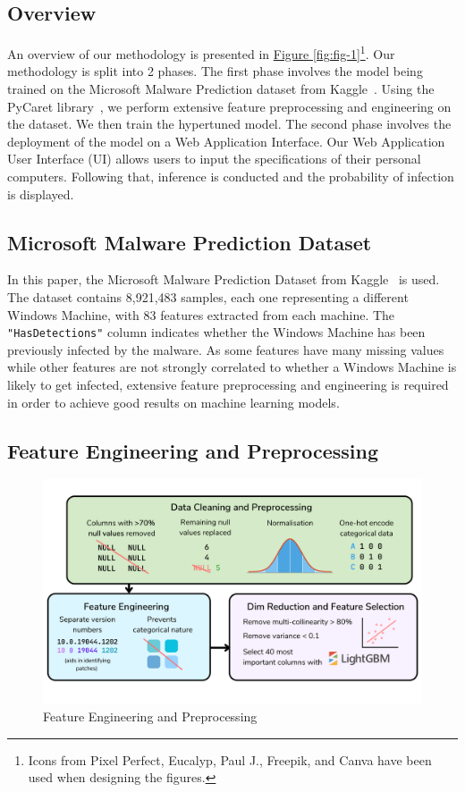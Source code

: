 \documentclass[pdflatex,sn-basic,Numbered]{sn-jnl}%
\theoremstyle{thmstyleone}%
\theoremstyle{thmstyletwo}%
\theoremstyle{thmstylethree}%
\newcommand{\reffig}[1]{\hyperref[#1]{Figure \ref*{#1}}}
\begin{document}
\subsection{Overview}\label{subsec:overview}
An overview of our methodology is presented in \reffig{fig:fig-1}\footnote[1]{Icons from Pixel Perfect, Eucalyp, Paul J., Freepik, and Canva have been used when designing the figures.}.
Our methodology is split into 2 phases.
The first phase involves the model being trained on the Microsoft Malware Prediction dataset from Kaggle~\cite{microsoft-malware-prediction}.
Using the PyCaret library~\cite{pycaret}, we perform extensive feature preprocessing and engineering on the dataset.
We then train the hypertuned model.
The second phase involves the deployment of the model on a Web Application Interface.
Our Web Application User Interface (UI) allows users to input the specifications of their personal computers.
Following that, inference is conducted and the probability of infection is displayed.

\subsection{Microsoft Malware Prediction Dataset}\label{subsec:microsoft-malware-prediction-dataset}
In this paper, the Microsoft Malware Prediction Dataset from Kaggle~\cite{microsoft-malware-prediction} is used.
The dataset contains 8,921,483 samples, each one representing a different Windows Machine, with 83 features extracted from each machine.
The \texttt{"HasDetections"} column indicates whether the Windows Machine has been previously infected by the malware.
As some features have many missing values while other features are not strongly correlated to whether a Windows Machine is likely to get infected, extensive feature preprocessing and engineering is required in order to achieve good results on machine learning models.

\subsection{Feature Engineering and Preprocessing}\label{subsec:feature-engineering-and-preprocessing}

\begin{figure}[h]
\includegraphics[scale=0.25]{images/feature_engineering}
\centering
\caption{Feature Engineering and Preprocessing}
\label{fig:fig-2}
\end{figure}
\end{document}
